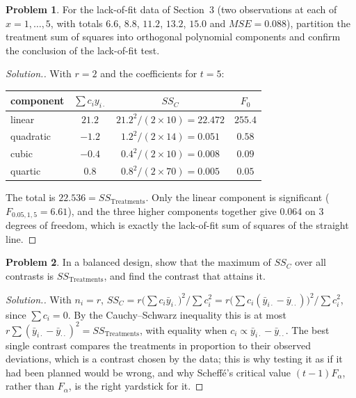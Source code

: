\documentclass[11pt,a4paper]{article}
\numberwithin{equation}{section}
\theoremstyle{definition}
\newtheorem{problemx}{Problem}[subsection]
\newenvironment{problem}{\begin{problemx}}{\end{problemx}}
\newenvironment{solution}
  {\renewcommand{\qedsymbol}{}\begin{proof}[\textit{Solution}.]}
  {\end{proof}}
\begin{document}
\begin{problem}
For the lack-of-fit data of Section~3 (two observations at each of $x = 1, \dots, 5$, with totals $6.6$, $8.8$, $11.2$, $13.2$, $15.0$ and $MSE = 0.088$), partition the
treatment sum of squares into orthogonal polynomial components and confirm the conclusion of the lack-of-fit test.
\end{problem}

\begin{solution}
With $r = 2$ and the coefficients for $t = 5$:
\begin{center}
\begin{tabular}{l|c|c|c}
component & $\sum c_iy_{i\cdot}$ & $SS_C$ & $F_0$ \\
\hline
linear & $21.2$ & $21.2^2/(2 \times 10) = 22.472$ & $255.4$ \\
quadratic & $-1.2$ & $1.2^2/(2 \times 14) = 0.051$ & $0.58$ \\
cubic & $-0.4$ & $0.4^2/(2 \times 10) = 0.008$ & $0.09$ \\
quartic & $0.8$ & $0.8^2/(2 \times 70) = 0.005$ & $0.05$
\end{tabular}
\end{center}
The total is $22.536 = SS_{\mathrm{Treatments}}$. Only the linear component is significant ($F_{0.05,1,5} = 6.61$), and the three higher components together give
$0.064$ on $3$ degrees of freedom, which is exactly the lack-of-fit sum of squares of the straight line.
\end{solution}

\begin{problem}
In a balanced design, show that the maximum of $SS_C$ over all contrasts is $SS_{\mathrm{Treatments}}$, and find the contrast that attains it.
\end{problem}

\begin{solution}
With $n_i = r$, $SS_C = r\bigl(\sum c_i\bar y_{i\cdot}\bigr)^2/\sum c_i^2 = r\bigl(\sum c_i(\bar y_{i\cdot} - \bar y_{\cdot\cdot})\bigr)^2/\sum c_i^2$, since $\sum c_i = 0$. By the Cauchy--Schwarz inequality this is at most
$r\sum(\bar y_{i\cdot} - \bar y_{\cdot\cdot})^2 = SS_{\mathrm{Treatments}}$, with equality when $c_i \propto \bar y_{i\cdot} - \bar y_{\cdot\cdot}$. The best single contrast compares the treatments in proportion to their observed
deviations, which is a contrast chosen by the data; this is why testing it as if it had been planned would be wrong, and why Scheff\'e's critical
value $(t - 1)F_\alpha$, rather than $F_\alpha$, is the right yardstick for it.
\end{solution}
\end{document}
